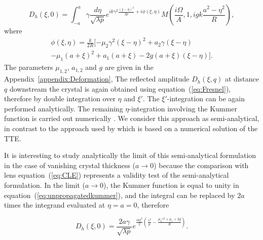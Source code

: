 \documentclass[preprint]{iucr}              %
\newcommand{\inred}[1]{{\color{red}#1}}
\begin{document}
\begin{equation}
\label{eq:unpropagatedkummer}
    D_h(\xi,0) = 
    \int_{-a}^{a} \gamma\frac{d\eta}{\sqrt{\lambda p}}
    e^{i k \gamma^2
    \frac{(\xi-\eta)^2}{2p}+i \phi(\xi,\eta)
    }
     M(\frac{i\Omega}{A},1,i g k \frac{a^2-\eta^2}{R}),
\end{equation}
where 
\begin{multline}
    \phi(\xi,\eta) =\frac{k}{2R}[-\mu_2\gamma^2(\xi-\eta)^2
    +a_2\gamma(\xi-\eta) \\
    -\mu_1(a+\xi)^2 
    +a_1(a+\xi)
    -2g(a+\xi)(\xi-\eta)].
\end{multline}
The parameters $\mu_{1,2}$, $a_{1,2}$ \inred{and $g$} are given in the Appendix~\ref{appendix:Deformation},
The reflected amplitude $D_h(\xi,q)$ at distance $q$ downstream the crystal is again obtained using equation~(\ref{eq:Fresnel}), therefore by double integration over $\eta$ and $\xi'$. The $\xi'$-integration can be again performed analytically. The remaining $\eta$-integration involving the Kummer function is carried out numerically \cite{GuigayFerrero2016}. We consider this approach as semi-analytical, in contrast to the approach used by \cite{Nesterets} which is based on a numerical solution of the TTE.

\inred{It is interesting to study analytically the limit of this semi-analytical formulation in the case of}
vanishing crystal thickness ($a\rightarrow0{}$) \inred{because the comparison with lens equation~(\ref{eq:CLE}) represents a validity test of the semi-analytical formulation. 
In the limit ($a\rightarrow0{}$),}
the Kummer function is equal to unity in equation~(\ref{eq:unpropagatedkummer}), and the integral can be replaced by $2a$ times the integrand evaluated at $\eta=a=0$, therefore


\begin{equation}
\label{eq:14reduced}
    D_h(\xi,0) = \frac{2 a \gamma}{\sqrt{\lambda p}} e^{\frac{i k \xi^2}{2}(\frac{\gamma^2}{p}-\frac{\mu_2\gamma^2+\mu_1+2g}{R})}.
\end{equation}
\end{document}
